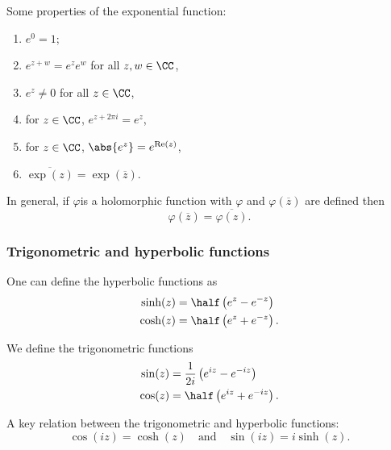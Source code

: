 \documentclass[12pt, a4paper]{article}
\DeclareMathOperator{\R}{Re}
\begin{document}
\begin{proposition}
    Some properties of the exponential function:
    \begin{enumerate}
        \item \(e^0 =1\);
        \item \(e^{z+w}=e^z e^w\) for all \(z,w \in \CC\),
        \item \(e^z \neq 0\) for all \(z \in \CC\),
        \item for \(z \in \CC\), \(e^{z+2\pi i}=e^z\),
        \item for \(z \in \CC\), \(\abs{e^z}=e^{\R(z)}\),
        \item \(\overline{\exp(z)}=\exp(\overline{z})\).
    \end{enumerate}
\end{proposition}

\begin{mdremark}
    In general, if \(\varphi\)is a holomorphic function with \(\varphi\) and \(\varphi(\overline{z})\) are defined then 
    \[\varphi(\overline{z}) = \overline{\varphi(z)}.\]
\end{mdremark}

\subsubsection{Trigonometric and hyperbolic functions}

\begin{definition}
    One can define the hyperbolic functions as 
    \[\begin{aligned}
        \sinh(z) &= \half \left( e^z -e^{-z} \right) \\
        \cosh(z) &= \half \left( e^z +e^{-z} \right).
    \end{aligned}\]
\end{definition}

\begin{definition}
    We define the trigonometric functions 
    \[\begin{aligned}
        \sin(z) &= \frac{1}{2i}\left( e^{iz} - e^{-iz} \right) \\
        \cos(z) &= \half \left( e^{iz}+e^{-iz} \right).
    \end{aligned}\]
\end{definition}

\begin{mdthm}
    A key relation between the trigonometric and hyperbolic functions:
    \[\cos(iz) = \cosh(z) \quad \text{and} \quad \sin(iz)=i\sinh(z).\]
\end{mdthm}
\end{document}
